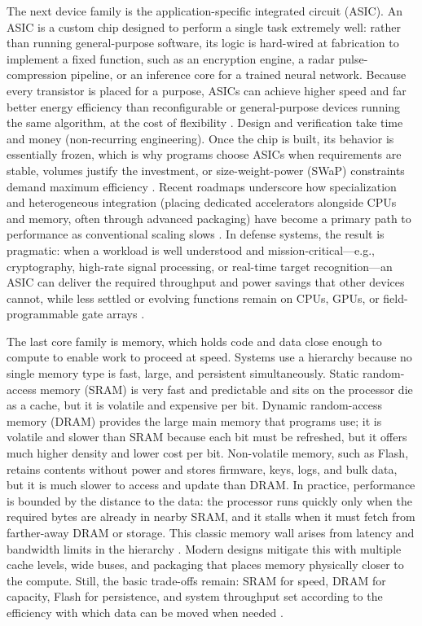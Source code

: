The next device family is the application-specific integrated circuit (ASIC). An ASIC is a custom chip designed to perform a single task extremely well: rather than running general-purpose software, its logic is hard-wired at fabrication to implement a fixed function, such as an encryption engine, a radar pulse-compression pipeline, or an inference core for a trained neural network. Because every transistor is placed for a purpose, ASICs can achieve higher speed and far better energy efficiency than reconfigurable or general-purpose devices running the same algorithm, at the cost of flexibility \parencite{kuon_measuring_2006}. Design and verification take time and money (non-recurring engineering). Once the chip is built, its behavior is essentially frozen, which is why programs choose ASICs when requirements are stable, volumes justify the investment, or size-weight-power (SWaP) constraints demand maximum efficiency \parencite{weste_cmos_2011,patterson_computer_2018}. Recent roadmaps underscore how specialization and heterogeneous integration (placing dedicated accelerators alongside CPUs and memory, often through advanced packaging) have become a primary path to performance as conventional scaling slows \parencite{neisser_international_2021}. In defense systems, the result is pragmatic: when a workload is well understood and mission-critical---e.g., cryptography, high-rate signal processing, or real-time target recognition---an ASIC can deliver the required throughput and power savings that other devices cannot, while less settled or evolving functions remain on CPUs, GPUs, or field-programmable gate arrays \parencite{patterson_computer_2018,kuon_measuring_2006}.

The last core family is memory, which holds code and data close enough to compute to enable work to proceed at speed. Systems use a hierarchy because no single memory type is fast, large, and persistent simultaneously. Static random-access memory (SRAM) is very fast and predictable and sits on the processor die as a cache, but it is volatile and expensive per bit. Dynamic random-access memory (DRAM) provides the large main memory that programs use; it is volatile and slower than SRAM because each bit must be refreshed, but it offers much higher density and lower cost per bit. Non-volatile memory, such as Flash, retains contents without power and stores firmware, keys, logs, and bulk data, but it is much slower to access and update than DRAM. In practice, performance is bounded by the distance to the data: the processor runs quickly only when the required bytes are already in nearby SRAM, and it stalls when it must fetch from farther-away DRAM or storage. This classic memory wall arises from latency and bandwidth limits in the hierarchy \parencite{jacob_memory_2008,wulf_hitting_1995}. Modern designs mitigate this with multiple cache levels, wide buses, and packaging that places memory physically closer to the compute. Still, the basic trade-offs remain: SRAM for speed, DRAM for capacity, Flash for persistence, and system throughput set according to the efficiency with which data can be moved when needed \parencite{patterson_computer_2018,rabaey_digital_2003}.

